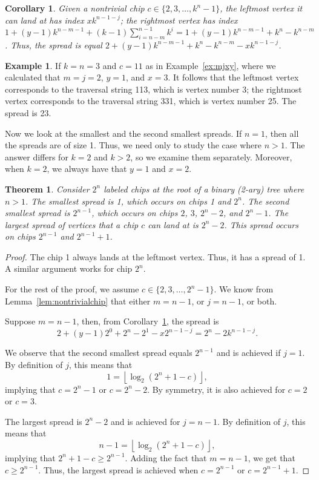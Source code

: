 \documentclass[11pt]{article}
\newtheorem{theorem}{Theorem}[section] %
\newtheorem{corollary}{Corollary}[theorem] %
\theoremstyle{definition}
\newtheorem{example}{Example}
\theoremstyle{remark}
\begin{document}
\begin{corollary}\label{cor:spreadsize}
    Given a nontrivial chip $c \in \{2, 3, \dots, k^n-1\}$, the leftmost vertex it can land at has index $xk^{n-1-j}$; the rightmost vertex has index $1 + (y-1)k^{n-m- 1} +(k-1)\sum_{i=n-m}^{n-1}k^i = 1+(y-1)k^{n-m-1}+k^n - k^{n-m}$. Thus, the spread is equal $2+(y-1)k^{n-m-1}+k^n - k^{n-m} - xk^{n-1-j}$.
\end{corollary}

\begin{example}
    If $k=n=3$ and $c = 11$ as in Example~\ref{ex:mjxy}, where we calculated that $m=j=2$, $y =1$, and $x=3$. It follows that the leftmost vertex corresponds to the traversal string 113, which is vertex number 3; the rightmost vertex corresponds to the traversal string 331, which is vertex number 25. The spread is 23.    
\end{example}

Now we look at the smallest and the second smallest spreads. If $n=1$, then all the spreads are of size 1. Thus, we need only to study the case where $n > 1$. The answer differs for $k=2$ and $k > 2$, so we examine them separately. Moreover, when $k=2$, we always have that $y=1$ and $x=2$.

\begin{theorem}
    Consider $2^n$ labeled chips at the root of a binary (2-ary) tree where $n > 1$. The smallest spread is 1, which occurs on chips 1 and $2^n$. The second smallest spread is $2^{n-1}$, which occurs on chips $2$, $3$, $2^n -2$, and $2^n -1$. The largest spread of vertices that a chip $c$ can land at is $2^n - 2$. This spread occurs on chips $2^{n-1}$ and $2^{n-1}+1$.
\end{theorem}

\begin{proof}
    The chip 1 always lands at the leftmost vertex. Thus, it has a spread of 1. A similar argument works for chip $2^n$.

For the rest of the proof, we assume $c \in \{2, 3, \dots, 2^n-1\}$. We know from Lemma~\ref{lem:nontrivialchip} that either $m = n-1$, or $j = n-1$, or both.

Suppose $m = n-1$, then, from Corollary~\ref{cor:spreadsize}, the spread is
\[2+(y-1)2^{0}+2^n - 2^{1} - x2^{n-1-j} = 2^n - 2k^{n-1-j}.\]

We observe that the second smallest spread equals $2^{n-1}$ and is achieved if $j = 1$. By definition of $j$, this means that
\[1 = \left \lfloor \log_2{(2^n+1-c)} \right \rfloor,\]
implying that $c = 2^n -1$ or $c=2^n-2$. By symmetry, it is also achieved for $c = 2$ or $c=3$.

The largest spread is $2^n-2$ and is achieved for $j=n-1$. By definition of $j$, this means that
\[n-1 = \left \lfloor \log_2{(2^n+1-c)} \right \rfloor,\]
implying that $2^n+1-c \geq 2^{n-1}$. Adding the fact that $m=n-1$, we get that $c \geq 2^{n-1}$. Thus, the largest spread is achieved when $c = 2^{n-1}$ or $c = 2^{n-1} + 1$.
\end{proof}
\end{document}
